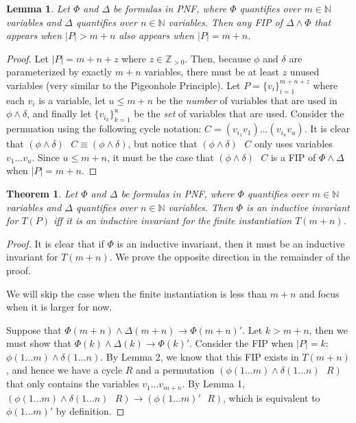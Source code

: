 \documentclass[12pt]{article}
\newtheorem{lemma}{Lemma}
\newtheorem{theorem}{Theorem}
\newcommand{\msp}{\text{ }}
\begin{document}
\begin{lemma}
  Let $\Phi$ and $\Delta$ be formulas in PNF, where $\Phi$ quantifies over $m \in \mathbb{N}$ variables and $\Delta$ quantifies over $n \in \mathbb{N}$ variables.  Then any FIP of $\Delta \land \Phi$ that appears when $|P| > m+n$ also appears when $|P| = m+n$.
\end{lemma}
\begin{proof}
  Let $|P| = m + n + z$ where $z \in \mathbb{Z}_{>0}$.  Then, because $\phi$ and $\delta$ are parameterized by exactly $m+n$ variables, there must be at least $z$ unused variables (very similar to the Pigeonhole Principle).  Let $P = \{v_i\}_{i=1}^{m+n+z}$ where each $v_i$ is a variable, let $u \leq m+n$ be the \textit{number} of variables that are used in $\phi \land \delta$, and finally let $\{v_{i_k}\}_{k=1}^{u}$ be the \textit{set} of variables that are used.  Consider the permuation using the following cycle notation: $C = (v_{i_1} v_1)...(v_{i_u} v_u)$.  It is clear that $(\phi \land \delta) \msp C \equiv (\phi \land \delta)$, but notice that $(\phi \land \delta) \msp C$ only uses variables $v_1 ... v_u$.  Since $u \leq m+n$, it must be the case that $(\phi \land \delta) \msp C$ is a FIP of $\Phi \land \Delta$ when $|P| = m+n$.
\end{proof}

\begin{theorem}
  Let $\Phi$ and $\Delta$ be formulas in PNF, where $\Phi$ quantifies over $m \in \mathbb{N}$ variables and $\Delta$ quantifies over $n \in \mathbb{N}$ variables.  Then $\Phi$ is an inductive invariant for $T(P)$ iff it is an inductive invariant for the finite instantiation $T(m+n)$.
\end{theorem}
\begin{proof}
  It is clear that if $\Phi$ is an inductive invariant, then it must be an inductive invariant for $T(m+n)$.  We prove the opposite direction in the remainder of the proof.

  We will skip the case when the finite instantiation is less than $m+n$ and focus when it is larger for now.

  Suppose that $\Phi(m+n) \land \Delta(m+n) \rightarrow \Phi(m+n)'$.  Let $k > m+n$, then we must show that $\Phi(k) \land \Delta(k) \rightarrow \Phi(k)'$.  Consider the FIP when $|P|=k$: $\phi(1 ... m) \land \delta(1 ... n)$.  By Lemma 2, we know that this FIP exists in $T(m+n)$, and hence we have a cycle $R$ and a permutation $(\phi(1 ... m) \land \delta(1 ... n) \msp R)$ that only contains the variables $v_1 ... v_{m+n}$.  By Lemma 1, $(\phi(1 ... m) \land \delta(1 ... n) \msp R) \rightarrow (\phi(1 ... m)' \msp R)$, which is equivalent to $\phi(1 ... m)'$ by definition.
\end{proof}
\end{document}
